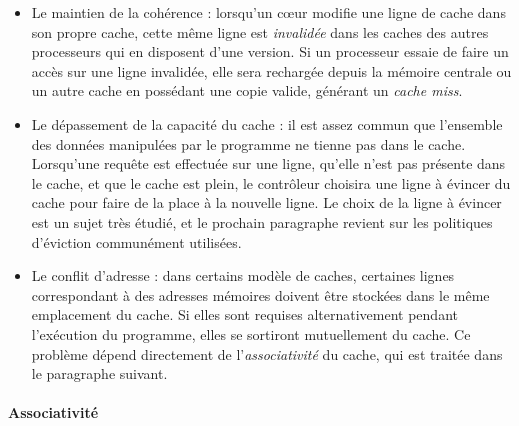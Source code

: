 \begin{itemize}
  \item Le maintien de la cohérence : lorsqu'un cœur modifie une ligne de cache dans son propre cache, cette même ligne est \emph{invalidée} dans les caches des autres processeurs qui en disposent d'une version.
Si un processeur essaie de faire un accès sur une ligne invalidée, elle sera rechargée depuis la mémoire centrale ou un autre cache en possédant une copie valide, générant un \emph{cache miss}.
  \item Le dépassement de la capacité du cache : il est assez commun que l'ensemble des données manipulées par le programme ne tienne pas dans le cache.
Lorsqu'une requête est effectuée sur une ligne, qu'elle n'est pas présente dans le cache, et que le cache est plein, le contrôleur choisira une ligne à évincer du cache pour faire de la place à la nouvelle ligne.
Le choix de la ligne à évincer est un sujet très étudié, et le prochain paragraphe revient sur les politiques d'éviction communément utilisées.
  \item Le conflit d'adresse : dans certains modèle de caches, certaines lignes correspondant à des adresses mémoires doivent être stockées dans le même emplacement du cache.
    Si elles sont requises alternativement pendant l'exécution du programme, elles se sortiront mutuellement du cache.
    Ce problème dépend directement de l'\emph{associativité} du cache, qui est traitée dans le paragraphe suivant.
\end{itemize}



\paragraph{Associativité}

